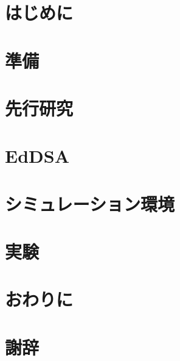\documentclass[
  luatex,
  paper=a4paper,
  fontsize=11pt,
  report,
  jlreq_notes,
]{jlreq}
\begin{document}

\tableofcontents

\clearpage

\chapter*{はじめに}

\chapter[　　 準備]{準備}

\chapter[　　 先行研究]{先行研究}

\chapter[　　 EdDSA]{EdDSA}

\chapter[　　 シミュレーション環境]{シミュレーション環境}

\chapter[　　 実験]{実験}

\chapter*{おわりに}

\chapter*{謝辞}



\end{document}
